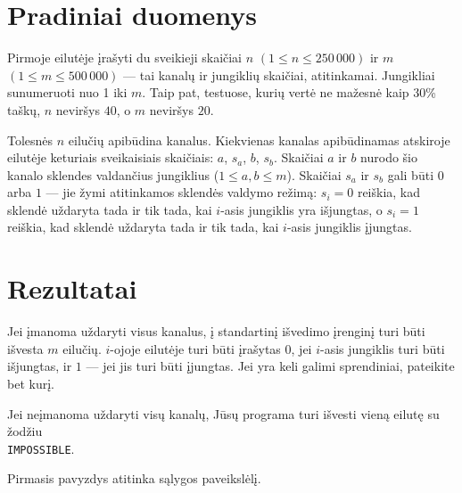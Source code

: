 \documentclass[zad,zawodnik,lt]{sinol}
\begin{document}
\begin{text}
    \section{Pradiniai duomenys}
      Pirmoje eilutėje įrašyti du sveikieji skaičiai $n$ $(1 \le n \le 250\,000)$ 
		ir $m$ $(1 \le m \le 500\,000)$ --- tai kanalų ir jungiklių skaičiai, atitinkamai. Jungikliai sunumeruoti nuo 1 iki $m$. Taip pat, testuose, kurių vertė ne mažesnė kaip $30$\% taškų, $n$ neviršys $40$, o $m$ neviršys $20$.		

      Tolesnės $n$ eilučių apibūdina kanalus.
      Kiekvienas kanalas apibūdinamas atskiroje eilutėje keturiais sveikaisiais skaičiais:
      $a$, $s_a$, $b$, $s_b$.
      Skaičiai $a$ ir $b$ nurodo šio kanalo sklendes valdančius jungiklius ($1\le a,b\le m$).
      Skaičiai $s_a$ ir $s_b$ gali būti $0$ arba $1$ --- jie žymi atitinkamos sklendės valdymo režimą:
      $s_i=0$ reiškia, kad sklendė uždaryta tada ir tik tada, kai $i$-asis jungiklis yra išjungtas,
      o $s_i=1$ reiškia, kad sklendė uždaryta tada ir tik tada, kai $i$-asis jungiklis įjungtas.
      
    \section{Rezultatai}
    
      Jei įmanoma uždaryti visus kanalus, į standartinį išvedimo įrenginį turi būti išvesta $m$ eilučių.
      $i$-ojoje eilutėje turi būti įrašytas $0$, jei $i$-asis jungiklis turi būti išjungtas, ir $1$ --- jei jis turi būti įjungtas.
      Jei yra keli galimi sprendiniai, pateikite bet kurį. 

      Jei neįmanoma uždaryti visų kanalų, Jūsų programa turi išvesti vieną eilutę su žodžiu\\ \texttt{IMPOSSIBLE}.

  \makecompactexample

  \noindent
  Pirmasis pavyzdys atitinka sąlygos paveikslėlį.
  \end{text}
\end{document}
